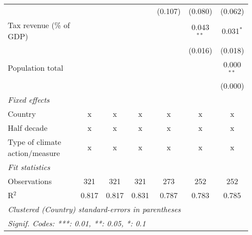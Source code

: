 \begin{tabular}{lcccccc}
                                                              &         &         &                & (0.107)        & (0.080)        & (0.062)\\   
   Tax revenue (\% of GDP)                                    &         &         &                &                & 0.043$^{**}$   & 0.031$^{*}$\\   
                                                              &         &         &                &                & (0.016)        & (0.018)\\   
   Population total                                           &         &         &                &                &                & 0.000$^{**}$\\   
                                                              &         &         &                &                &                & (0.000)\\   
   \emph{Fixed effects}\\
   Country                                                    & x       & x       & x              & x              & x              & x\\  
   Half decade                                                & x       & x       & x              & x              & x              & x\\  
   Type of climate action/measure                             & x       & x       & x              & x              & x              & x\\  
   \midrule \emph{Fit statistics}\\
   Observations                                               & 321     & 321     & 321            & 273            & 252            & 252\\  
   R$^2$                                                      & 0.817   & 0.817   & 0.831          & 0.787          & 0.783          & 0.785\\  
   \midrule
   \multicolumn{7}{l}{\emph{Clustered (Country) standard-errors in parentheses}}\\
   \multicolumn{7}{l}{\emph{Signif. Codes: ***: 0.01, **: 0.05, *: 0.1}}\\
\end{tabular}
\par\endgroup



